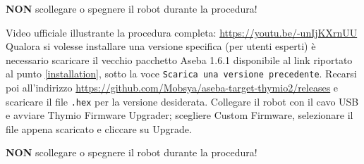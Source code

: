 \documentclass[12pt]{article}
\begin{document}
	\textbf{NON} scollegare o spegnere il robot durante la procedura!
	
	Video ufficiale illustrante la procedura completa: \url{https://youtu.be/-unIjKXrnUU}\\
	
	
	Qualora si volesse installare una versione specifica (per utenti esperti) è necessario scaricare il vecchio pacchetto Aseba 1.6.1 disponibile al link riportato al punto \ref{installation}, sotto la voce \texttt{Scarica una versione precedente}.	
	Recarsi poi all'indirizzo \url{https://github.com/Mobsya/aseba-target-thymio2/releases} e scaricare il file \texttt{.hex} per la versione desiderata. Collegare il robot con il cavo USB e avviare Thymio Firmware Upgrader; scegliere Custom Firmware, selezionare il file appena scaricato e cliccare su Upgrade. 
	
	\textbf{NON} scollegare o spegnere il robot durante la procedura!
	
\end{document}
